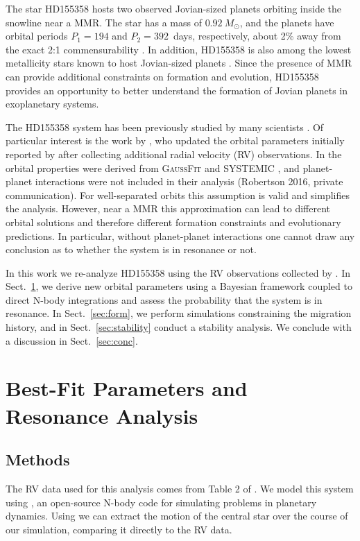 The star HD155358 hosts two observed Jovian-sized planets orbiting inside the snowline near a MMR. 
The star has a mass of $0.92~M_{\odot}$, and the planets have orbital periods $P_1 = 194$ and $P_2 = 392$~days, respectively, about 2\% away from the exact 2:1 commensurability \citep[][hereafter \R]{Robertson2012}. 
In addition, HD155358 is also among the lowest metallicity stars known to host Jovian-sized planets \citep{Cochran2007}.
Since the presence of MMR can provide additional constraints on formation and evolution, HD155358 provides an opportunity to better understand the formation of Jovian planets in exoplanetary systems.

The HD155358 system has been previously studied by many scientists \citep{Cochran2007,Fuhrmann2008,Robertson2012,Andre2016}.
Of particular interest is the work by \R, who updated the orbital parameters initially reported by \citet{Cochran2007} after collecting additional radial velocity (RV) observations.
In \R the orbital properties were derived from \textsc{GaussFit\-} \citep{Jefferys1988} and \textsc{SYSTEMIC} \citep{Meschiari2009}, and planet-planet interactions were not included in their analysis (Robertson 2016, private communication). 
For well-separated orbits this assumption is valid and simplifies the analysis.
However, near a MMR this approximation can lead to different orbital solutions and therefore different formation constraints and evolutionary predictions. 
In particular, without planet-planet interactions one cannot draw any conclusion as to whether the system is in resonance or not. 

In this work we re-analyze HD155358 using the RV observations collected by \R.
In Sect.~\ref{sec:orb}, we derive new orbital parameters using a Bayesian framework coupled to direct N-body integrations and assess the probability that the system is in resonance.
In Sect.~\ref{sec:form}, we perform simulations constraining the migration history, and in Sect.~\ref{sec:stability} conduct a stability analysis. 
We conclude with a discussion in Sect.~\ref{sec:conc}.

\section{Best-Fit Parameters and Resonance Analysis}
\label{sec:orb}
\subsection{Methods}
\label{sec:Fit}
The RV data used for this analysis comes from Table 2 of \R. 
We model this system using \reb \citep{Rein2012}, an open-source N-body code for simulating problems in planetary dynamics.
Using \reb we can extract the motion of the central star over the course of our simulation, comparing it directly to the RV data. 

